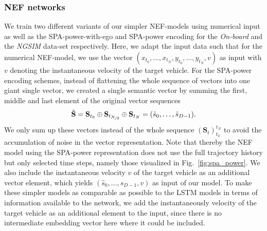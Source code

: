 \subsubsection{\ac{NEF} networks}

We train two different variants of our simpler \ac{NEF}-models using numerical input as well as the \ac{SPA}-power-with-ego and \ac{SPA}-power encoding for the \emph{On-board} and the \emph{\ac{NGSIM}} data-set respectively.
Here, we adapt the input data such that for the numerical \ac{NEF}-model, we use the vector $(x_{t_{0}}, \ldots, x_{t_{N}}, y_{t_{0}}, \ldots, y_{t_{N}}, v)$ as input with $v$ denoting the instantaneous velocity of the target vehicle.
For the \ac{SPA}-power encoding schemes, instead of flattening the whole sequence of vectors into one giant single vector, we created a single semantic vector by summing the first, middle and last element of the original vector sequences
\begin{equation}
  \hat{\mathbf{S}} =  \mathbf{S}_{t_0} \oplus \mathbf{S}_{t_{\nicefrac{N}{2}}} \oplus \mathbf{S}_{t_N} = (\hat{s}_0, \ldots, \hat{s}_{D-1}).
\end{equation}
We only sum up these vectors instead of the whole sequence $(\mathbf{S}_{t})_{t_0}^{t_N}$ to avoid the accumulation of noise in the vector representation.
Note that thereby the \ac{NEF} model using the \ac{SPA}-power representation does not use the full trajectory history but only selected time steps, namely those visualized in Fig.~\ref{fig:spa_power}.
We also include the instantaneous velocity $v$ of the target vehicle as an additional vector element, which yields $(\hat{s}_0, \ldots, \hat{s}_{D-1}, v)$ as input of our model.
To make these simpler models as comparable as possible to the \ac{LSTM} models in terms of information available to the network, we add the instantaneously velocity of the target vehicle as an additional element to the input, since there is no intermediate embedding vector here where it could be included.

